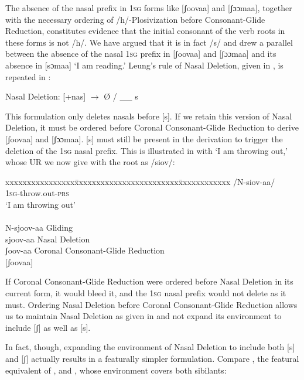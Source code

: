 \documentclass[output=paper]{langsci/langscibook}
\begin{document}
The absence of the nasal prefix in 1\textsc{sg} forms like [ʃoovaa] and [ʃɔɔmaa], together with the necessary ordering of /h/-Plosivization before Consonant-Glide Reduction, constitutes evidence that the initial consonant of the verb roots in these forms is not /h/. We have argued that it is in fact /s/ and drew a parallel between the absence of the nasal 1\textsc{sg} prefix in [ʃoovaa] and [ʃɔɔmaa] and its absence in [sɔmaa] ‘I am reading.’ Leung’s rule of Nasal Deletion, given in , is repeated in :

\ea\label{ex:glewwe:28}{}
 Nasal Deletion: [+nas] $\rightarrow$ Ø / \_\_ s\\{}
\z

This formulation only deletes nasals before [s]. If we retain this version of Nasal Deletion, it must be ordered before Coronal Consonant-Glide Reduction to derive [ʃoovaa] and [ʃɔɔmaa]. [s] must still be present in the derivation to trigger the deletion of the 1\textsc{sg} nasal prefix. This is illustrated in  with ‘I am throwing out,’ whose UR we now give with the root as /siov/:

\ea\label{ex:glewwe:29}{}
\begin{tabbing}
xxxxxxxxxxxxxxxx\=xxxxxxxxxxxxxxxxxxxxxxxx\=xxxxxxxxxxxx\kill
/N-siov-aa/ \\
\textsc{1sg}-throw.out-\textsc{prs}\\
‘I am throwing out’ \\
   \\
N-sjoov-aa \> Gliding\\{}
sjoov-aa \>  Nasal Deletion\\{}
ʃoov-aa \> Coronal Consonant-Glide Reduction\\{}
[ʃoovaa]  \\
\end{tabbing}
\z

If Coronal Consonant-Glide Reduction were ordered before Nasal Deletion in its current form, it would bleed it, and the 1\textsc{sg} nasal prefix would not delete as it must. Ordering Nasal Deletion before Coronal Consonant-Glide Reduction allows us to maintain Nasal Deletion as given in  and not expand its environment to include [ʃ] as well as [s]. 

In fact, though, expanding the environment of Nasal Deletion to include both [s] and [ʃ] actually results in a featurally simpler formulation. Compare , the featural equivalent of , and , whose environment covers both sibilants:
\end{document}
